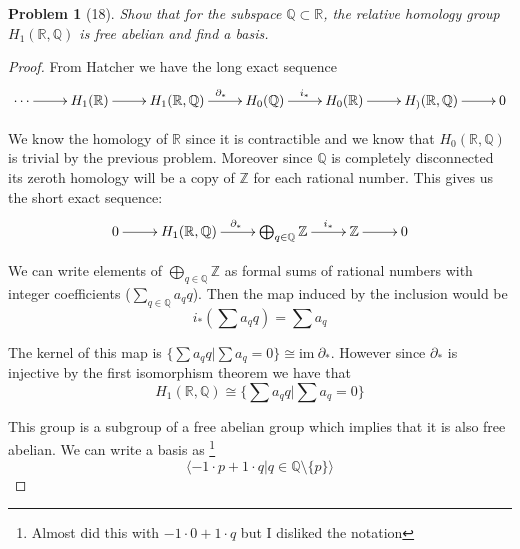 \documentclass[10pt]{article}
\newcommand{\sk}{\vskip 10mm}
\newcommand{\bb}[1]{\mathbb{#1}}
\newcommand{\ima}{\mathrm{im}\ }
\theoremstyle{plain}
\newtheorem{problem}{Problem}
\theoremstyle{remark}
\begin{document}
\sk

\begin{problem}[18]
  Show that for the subspace $\bb{Q}\subset\bb{R}$, the relative homology group
  $H_1(\bb{R},\bb{Q})$ is free abelian and find a basis.
\end{problem}

\begin{proof}
  From Hatcher we have the long exact sequence
  \[
    \xymatrix{\cdots \ar[r] & H_1(\bb{R})\ar[r] & H_1(\bb{R},\bb{Q})\ar[r]^{\partial_*}
      & H_0(\bb{Q})\ar[r]^{i_*} & H_0(\bb{R}) \ar[r] & H_)(\bb{R},\bb{Q}) \ar[r] & 0 }
  \]

  We know the homology of $\bb{R}$ since it is contractible and we know that
  $H_0(\bb{R},\bb{Q})$ is trivial by the previous problem. Moreover since
  $\bb{Q}$ is completely disconnected its zeroth homology will be a copy
  of $\bb{Z}$ for each rational number. This gives us the short exact sequence:
  \[
    \xymatrix{0 \ar[r] & H_1(\bb{R},\bb{Q})\ar[r]^{\partial_*}&\bigoplus_{q\in\bb{Q}}\bb{Z}\ar[r]^-{i_*}
      &\bb{Z}\ar[r] & 0 }
  \]

  We can write elements of $\bigoplus_{q\in\bb{Q}}\bb{Z}$ as formal sums of rational
  numbers with integer coefficients ($\sum_{q\in\bb{Q}}a_qq$). Then the
  map induced by the inclusion would be
  \[
    i_*\left(\sum a_qq\right) = \sum a_q
  \]

  The kernel of this map is $\{\sum a_qq | \sum a_q=0\}\cong \ima \partial_*$. However since
  $\partial_*$ is injective by the first isomorphism theorem we have that
  \[
    H_1(\bb{R},\bb{Q})\cong \{\sum a_qq|\sum a_q=0\}
  \]

  This group is a subgroup of a free abelian group which implies that it is
  also free abelian. We can write a basis as
  \footnote{Almost did this with $-1\cdot 0+1\cdot q$ but I disliked the notation} 
  \[
    \langle -1\cdot p+1\cdot q| q\in\bb{Q}\setminus\{p\}\rangle
  \]
  
\end{proof}

\end{document}
